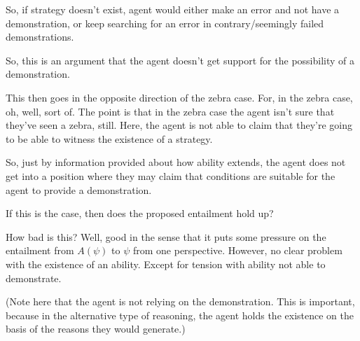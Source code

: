 \documentclass[10pt]{article}
\begin{document}
\begin{note}
{    So, if strategy doesn't exist, agent would either make an error and not have a demonstration, or keep searching for an error in contrary/seemingly failed demonstrations.
    

    So, this is an argument that the agent doesn't get support for the possibility of a demonstration.
    
  }

  {
    \color{green}
    This then goes in the opposite direction of the zebra case.
    For, in the zebra case, oh, well, sort of.
    The point is that in the zebra case the agent isn't sure that they've seen a zebra, still.
    Here, the agent is not able to claim that they're going to be able to witness the existence of a strategy.

    So, just by information provided about how ability extends, the agent does not get into a position where they may claim that conditions are suitable for the agent to provide a demonstration.

    If this is the case, then does the proposed entailment hold up?
    
  }

  {
    \color{red}
    How bad is this?
    Well, good in the sense that it puts some pressure on the entailment from \(A(\psi)\) to \(\psi\) from one perspective.
    However, no clear problem with the existence of an ability.
    Except for tension with ability not able to demonstrate.
    
  }


  

  (Note here that the agent is not relying on the demonstration.
  This is important, because in the alternative type of reasoning, the agent holds the existence on the basis of the reasons they would generate.)
\end{note}
\end{document}
